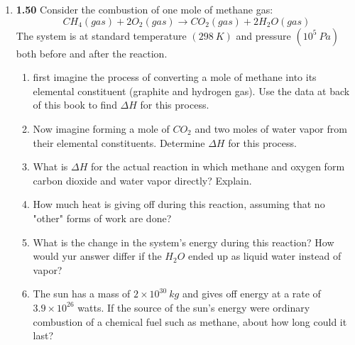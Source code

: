 \documentclass[fleqn]{article}
\begin{document}
  \begin{enumerate}
    \item \textbf{1.50} Consider the combustion of one mole of methane gas:
    $$
      CH_4(gas)+2O_2(gas) \longrightarrow CO_2(gas)+2H_2O(gas)
    $$
    The system is at standard temperature $(298 ~ K)$ and pressure $(10^5 ~ Pa)$ both before and after 
    the reaction.
    \begin{enumerate}
      \item first imagine the process of converting a mole of methane into its elemental constituent (graphite and hydrogen gas).
      Use the data at back of this book to find $\Delta H$ for this process.


      \item Now imagine forming a mole of $CO_2$ and two moles of water vapor from their elemental constituents. Determine 
      $\Delta H$ for this process.


      \item What is $\Delta H$ for the actual reaction in which methane and oxygen form carbon dioxide and water vapor 
      directly? Explain.


      \item How much heat is giving off during this reaction, assuming that no "other" forms of work are done?


      \item What is the change in the system's energy during this reaction? How would yur answer differ if 
      the $H_2O$ ended up as liquid water instead of vapor?


      \item The sun has a mass of $2 \times 10^{30} ~ kg$ and gives off energy at a rate of $3.9 \times 10^{26}$
      watts. If the source of the sun's energy were ordinary combustion of a chemical fuel such as methane, about 
      how long could it last?


\end{enumerate}
\end{enumerate}
\end{document}
